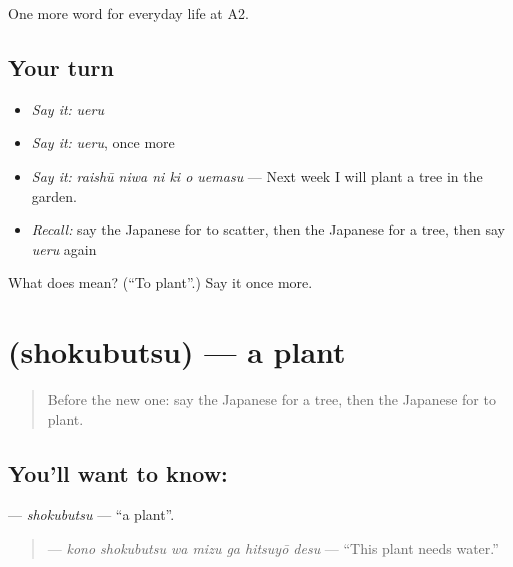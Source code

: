 \begin{grammarlens}[title={What you've built}]
One more word for everyday life at A2.
\end{grammarlens}

\subsection*{Your turn}
\begin{itemize}
\raggedright
  \item \emph{Say it:} \emph{ueru}
  \item \emph{Say it:} \emph{ueru}, once more
  \item \emph{Say it:} \emph{raishū niwa ni ki o uemasu} — Next week I will plant a tree in the garden.
  \item \emph{Recall:} say the Japanese for to scatter, then the Japanese for a tree, then say \emph{ueru} again
\end{itemize}

\begin{tcolorbox}[breakable,colback=teal!4,colframe=teal!35!black,title={Before you move on}]
What does  mean? (\textquotedblleft{}To plant\textquotedblright{}.) Say it once more.
\end{tcolorbox}
\section[\texorpdfstring{\ja{しょくぶつ} (shokubutsu)}{しょくぶつ (shokubutsu)}]{ (shokubutsu) — a plant}

\label{lesson:JA-C210-shokubutsu}



\begin{quote}
Before the new one: say the Japanese for a tree, then the Japanese for to plant.
\end{quote}

\subsection*{You'll want to know: }
\textbf{} — \emph{shokubutsu} — \textquotedblleft{}a plant\textquotedblright{}.

\begin{quote}
\textbf{   } — \emph{kono shokubutsu wa mizu ga hitsuyō desu} — \textquotedblleft{}This plant needs water.\textquotedblright{}
\end{quote}


